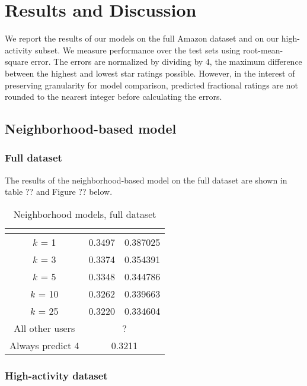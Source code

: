 \documentclass[letterpaper, 10 pt, conference]{ieeeconf}
\begin{document}
\section{Results and Discussion}
\label{sec:results}

We report the results of our models on the full Amazon dataset and on our 
high-activity subset. We measure performance over the test sets using 
root-mean-square error. The errors are normalized by dividing by 4, the maximum 
difference between the highest and lowest star ratings possible. However, 
in the interest of preserving granularity for model comparison, predicted
fractional ratings are not rounded to the nearest integer before calculating 
the errors. 

\subsection{Neighborhood-based model}
\subsubsection{Full dataset}
The results of the neighborhood-based model on the full dataset are shown in 
table ?? and Figure ?? below.


\begin{table}[htb]
\centering
\begin{tabular}{|c|c|c|}
\cline{2-3}

\multicolumn{1}{c|}{} & \vbox{\hbox{\strut Neighborhood model}} 
& \vbox{\hbox{\strut Modified }\hbox{\strut neighborhood model}} \tabularnewline \hline
$k$ = 1 & 0.3497 & 0.387025 \tabularnewline
$k$ = 3 &  0.3374 & 0.354391 \tabularnewline
$k$ = 5 & 0.3348 & 0.344786 \tabularnewline
$k$ = 10 & 0.3262 & 0.339663 \tabularnewline
$k$ = 25  & 0.3220 & 0.334604 \tabularnewline
\hline
All other users & \multicolumn{2}{|c|}{?}  \tabularnewline
\hline
Always predict 4 & \multicolumn{2}{|c|}{0.3211}  \tabularnewline
\hline
\end{tabular}
\caption{Neighborhood models, full dataset}
\end{table}

\subsubsection{High-activity dataset}
\end{document}
